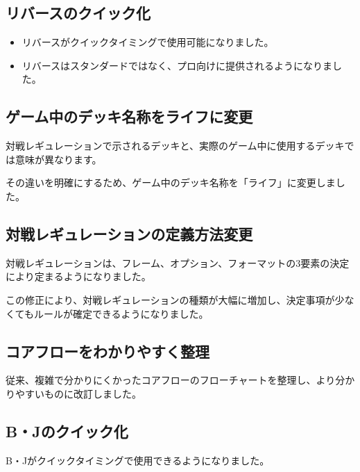 \documentclass[letterpaper,10pt,dvipdfmx]{sphinxmanual}
\begin{document}
\subsection{リバースのクイック化}
\label{\detokenize{revision-history/7th:id2}}\begin{itemize}
\item {} 
\sphinxAtStartPar
リバースがクイックタイミングで使用可能になりました。

\item {} 
\sphinxAtStartPar
リバースはスタンダードではなく、プロ向けに提供されるようになりました。

\end{itemize}


\subsection{ゲーム中のデッキ名称をライフに変更}
\label{\detokenize{revision-history/7th:id3}}
\sphinxAtStartPar
対戦レギュレーションで示されるデッキと、実際のゲーム中に使用するデッキでは意味が異なります。

\sphinxAtStartPar
その違いを明確にするため、ゲーム中のデッキ名称を「ライフ」に変更しました。


\subsection{対戦レギュレーションの定義方法変更}
\label{\detokenize{revision-history/7th:id4}}
\sphinxAtStartPar
対戦レギュレーションは、フレーム、オプション、フォーマットの3要素の決定により定まるようになりました。

\sphinxAtStartPar
この修正により、対戦レギュレーションの種類が大幅に増加し、決定事項が少なくてもルールが確定できるようになりました。


\subsection{コアフローをわかりやすく整理}
\label{\detokenize{revision-history/7th:id5}}
\sphinxAtStartPar
従来、複雑で分かりにくかったコアフローのフローチャートを整理し、より分かりやすいものに改訂しました。


\subsection{B・Jのクイック化}
\label{\detokenize{revision-history/7th:bj}}
\sphinxAtStartPar
B・Jがクイックタイミングで使用できるようになりました。
\end{document}
